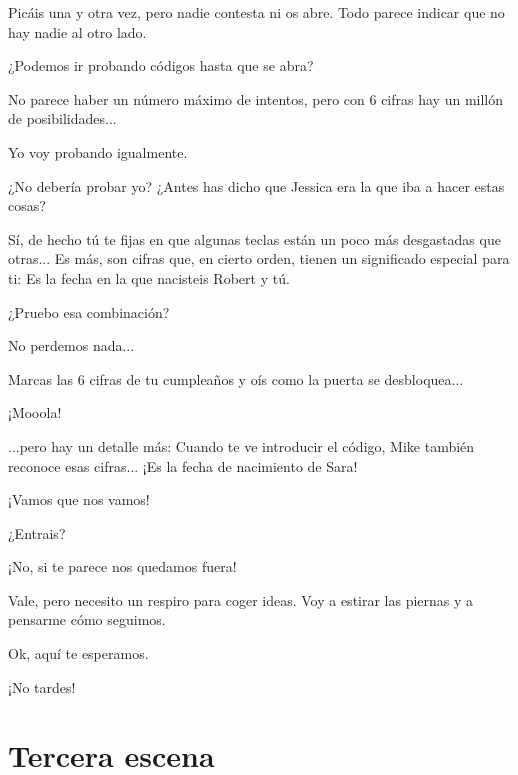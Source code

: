 \documentclass[10pt, a5paper, twocolumn]{article}
\newenvironment{dialogue}
    {\begin{description}[leftmargin=!,align=right,labelwidth=0.cm]}
    {\end{description}}
\newcommand\A{\item[\raisebox{-0.25em}{\scalebox{0.75}{\bctetraedre}}]}
\newcommand\B{\item[\raisebox{-0.25em}{\scalebox{0.75}{\bccube}}]}
\newcommand\E{\item[\raisebox{-0.25em}{\scalebox{0.75}{\bcicosaedre}}]}
\begin{document}
\begin{dialogue}
        \E Picáis una y otra vez, pero nadie contesta ni os abre. Todo parece indicar que no hay nadie al otro lado.
        \B ¿Podemos ir probando códigos hasta que se abra?
        \E No parece haber un número máximo de intentos, pero con 6 cifras hay un millón de posibilidades...
        \B Yo voy probando igualmente.
        \A ¿No debería probar yo? ¿Antes has dicho que Jessica era la que iba a hacer estas cosas?
        \E Sí, de hecho tú te fijas en que algunas teclas están un poco más desgastadas que otras... Es más, son cifras que, en cierto orden, tienen un significado especial para ti: Es la fecha en la que nacisteis Robert y tú.
        \A ¿Pruebo esa combinación?
        \B No perdemos nada...
        \E Marcas las 6 cifras de tu cumpleaños y oís como la puerta se desbloquea...
        \A ¡Mooola!
        \E ...pero hay un detalle más: Cuando te ve introducir el código, Mike también reconoce esas cifras... ¡Es la fecha de nacimiento de Sara!
        \B ¡Vamos que nos vamos!
        \E ¿Entrais?
        \A ¡No, si te parece nos quedamos fuera!
        \E Vale, pero necesito un respiro para coger ideas. Voy a estirar las piernas y a pensarme cómo seguimos.
        \B Ok, aquí te esperamos.
        \A ¡No tardes!
    \end{dialogue}

    \section*{Tercera escena} %
\end{document}
